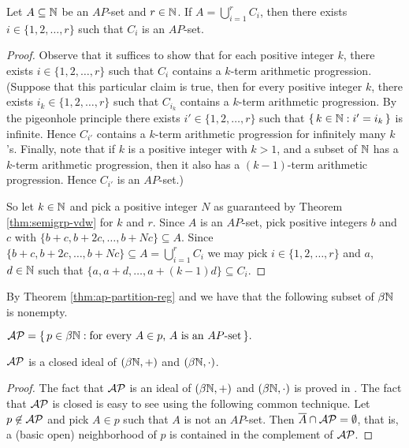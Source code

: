 \begin{thm}
  \label{thm:ap-partition-reg}
  Let $A \subseteq \mathbb{N}$ be an $AP$-set and $r \in \mathbb{N}$.
  If $A = \bigcup_{i=1}^r C_i$, then there exists $i \in \{1, 2, \ldots, r\}$ such that $C_i$ is an $AP$-set.
\end{thm}
\begin{proof}
  Observe that it suffices to show that for each positive integer $k$, there exists $i \in \{1, 2, \ldots, r\}$ such that $C_i$ contains a $k$-term arithmetic progression.
  (Suppose that this particular claim is true, then for every positive integer $k$, there exists $i_k \in \{1, 2, \ldots, r\}$ such that $C_{i_k}$ contains a $k$-term arithmetic progression. 
  By the pigeonhole principle there exists $i' \in \{1, 2, \ldots, r\}$ such that $\{\, k \in \mathbb{N} : i' = i_k \,\}$ is infinite.
  Hence $C_{i'}$ contains a $k$-term arithmetic progression for infinitely many $k$'s. 
  Finally, note that if $k$ is a positive integer with $k > 1$, and a subset of $\mathbb{N}$ has a $k$-term arithmetic progression, then it also has a $(k-1)$-term arithmetic progression.
  Hence $C_{i'}$ is an $AP$-set.)

  So let $k \in \mathbb{N}$ and pick a positive integer $N$ as guaranteed by Theorem \ref{thm:semigrp-vdw} for $k$ and $r$.
  Since $A$ is an $AP$-set, pick positive integers $b$ and $c$ with $\{b+c, b+2c, \ldots, b+Nc\} \subseteq A$. 
  Since $\{b+c, b+2c, \ldots, b+Nc \} \subseteq A = \bigcup_{i=1}^r C_i$ we may pick $i \in \{1, 2, \ldots, r\}$ and $a$, $d \in \mathbb{N}$ such that $\{a, a+d, \ldots, a+(k-1)d\} \subseteq C_i$.
\end{proof}

By Theorem \ref{thm:ap-partition-reg} and \cite[Theorem 3.11]{Hindman:1998fk} we have that the following subset of $\beta \mathbb{N}$ is nonempty.

\begin{defn}
  $\mathcal{AP} = \{\, p \in \beta \mathbb{N} : \mbox{for every $A \in p$, $A$ is an $AP$-set} \,\}.$
\end{defn}

\begin{thm}
  $\mathcal{AP}$ is a closed ideal of $(\beta \mathbb{N}, +)$ and $(\beta \mathbb{N}, \cdot)$.
\end{thm}
\begin{proof}
  The fact that $\mathcal{AP}$ is an ideal of $(\beta \mathbb{N}, +)$ and $(\beta \mathbb{N}, \cdot)$ is proved in \cite[Theorem 14.5]{Hindman:1998fk}. 
  The fact that $\mathcal{AP}$ is closed is easy to see using the following common technique.
  Let $p \not\in \mathcal{AP}$ and pick $A \in p$ such that $A$ is not an $AP$-set.
  Then $\overline{A} \cap \mathcal{AP} = \emptyset$, that is, a (basic open) neighborhood of $p$ is contained in the complement of $\mathcal{AP}$.
\end{proof}

